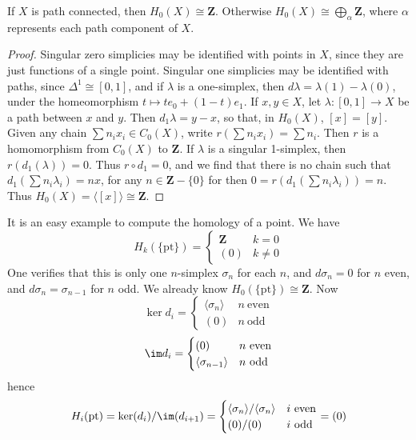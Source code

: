 \begin{corollary}
    If $X$ is path connected, then $H_0(X) \cong \mathbf{Z}$. Otherwise $H_0(X) \cong \bigoplus_\alpha \mathbf{Z}$, where $\alpha$ represents each path component of $X$.
\end{corollary}
\begin{proof}
    Singular zero simplicies may be identified with points in $X$, since they are just functions of a single point. Singular one simplicies may be identified with paths, since $\Delta^1 \cong [0,1]$, and if $\lambda$ is a one-simplex, then $d\lambda = \lambda(1) - \lambda(0)$, under the homeomorphism $t \mapsto t e_0 + (1 - t) e_1$. If $x,y \in X$, let $\lambda: [0,1] \to X$ be a path between $x$ and $y$. Then $d_1 \lambda = y - x$, so that, in $H_0(X)$, $[x] = [y]$. Given any chain $\sum n_i x_i \in C_0(X)$, write $r(\sum n_i x_i) = \sum n_i$. Then $r$ is a homomorphism from $C_0(X)$ to $\mathbf{Z}$. If $\lambda$ is a singular 1-simplex, then $r(d_1(\lambda)) = 0$.  Thus $r \circ d_1 = 0$, and we find that there is no chain such that $d_1(\sum n_i \lambda_i) = nx$, for any $n \in \mathbf{Z} - \{ 0 \}$ for then $0 = r(d_1(\sum n_i \lambda_i)) = n$. Thus $H_0(X) = \langle [x] \rangle \cong \mathbf{Z}$.
\end{proof}

\begin{example}
    It is an easy example to compute the homology of a point. We have
    \[ H_k(\{ \text{pt} \}) = \begin{cases} \mathbf{Z} & k = 0 \\ (0) & k \neq 0 \end{cases} \]
    One verifies that this is only one $n$-simplex $\sigma_n$ for each $n$, and $d \sigma_n = 0$ for $n$ even, and $d \sigma_n = \sigma_{n-1}$ for $n$ odd. We already know $H_0(\{ \text{pt} \}) \cong \mathbf{Z}$. Now
    \[ \ker d_i = \begin{cases} \langle \sigma_n \rangle & n\ \text{even} \\ (0) & n\ \text{odd} \end{cases} \]
    \[ \im d_i = \begin{cases} (0) & n\ \text{even} \\ \langle \sigma_{n-1} \rangle & n\ \text{odd} \end{cases} \]
    hence
    \[ H_i(\text{pt}) = \ker(d_i)/\im(d_{i+1}) = \begin{cases} \langle \sigma_n \rangle / \langle \sigma_n \rangle & i\ \text{even} \\ (0)/(0) & i\ \text{odd} \end{cases} = (0) \]
\end{example}

